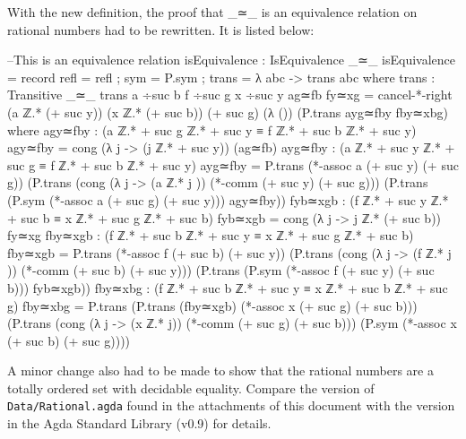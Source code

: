 \documentclass[11pt,a4paper]{article}
\begin{document}
With the new definition, the proof that \_≃\_ is an equivalence relation on rational numbers had to be rewritten. It is listed below:
\begin{code}
--This is an equivalence relation
isEquivalence : IsEquivalence _≃_
isEquivalence = record {
  refl = refl ;
  sym = P.sym ;
  trans = λ {a}{b}{c} -> trans {a}{b}{c}
  }
    where
    trans : Transitive _≃_
    trans {a ÷suc b} {f ÷suc g} {x ÷suc y} ag≃fb fy≃xg = 
      cancel-*-right (a ℤ.* (+ suc y)) (x ℤ.* (+ suc b)) (+ suc g) (λ {()}) 
        (P.trans ayg≃fby fby≃xbg)
      where
        agy≃fby : (a ℤ.* + suc g ℤ.* + suc y ≡ f ℤ.* + suc b ℤ.* + suc y)
        agy≃fby = cong (λ j -> (j ℤ.* + suc y)) (ag≃fb)
        ayg≃fby : (a ℤ.* + suc y ℤ.* + suc g ≡ f ℤ.* + suc b ℤ.* + suc y)
        ayg≃fby = P.trans (*-assoc a (+ suc y) (+ suc g)) 
          (P.trans (cong (λ j -> (a ℤ.* j )) (*-comm (+ suc y) (+ suc g))) 
            (P.trans (P.sym (*-assoc a (+ suc g) (+ suc y))) agy≃fby))
        fyb≃xgb : (f ℤ.* + suc y ℤ.* + suc b ≡ x ℤ.* + suc g ℤ.* + suc b)
        fyb≃xgb = cong (λ j -> j ℤ.* (+ suc b)) fy≃xg
        fby≃xgb : (f ℤ.* + suc b ℤ.* + suc y ≡ x ℤ.* + suc g ℤ.* + suc b)
        fby≃xgb = P.trans (*-assoc f (+ suc b) (+ suc y)) 
          (P.trans (cong (λ j -> (f ℤ.* j )) (*-comm (+ suc b) (+ suc y))) 
            (P.trans (P.sym (*-assoc f (+ suc y) (+ suc b))) fyb≃xgb))
        fby≃xbg : (f ℤ.* + suc b ℤ.* + suc y ≡ x ℤ.* + suc b ℤ.* + suc g)
        fby≃xbg = P.trans (P.trans (fby≃xgb) (*-assoc x (+ suc g) (+ suc b))) 
          (P.trans (cong (λ j -> (x ℤ.* j)) (*-comm (+ suc g) (+ suc b))) 
            (P.sym (*-assoc x (+ suc b) (+ suc g))))
\end{code}
A minor change also had to be made to show that the rational numbers are a totally ordered set with decidable equality. Compare the version of \texttt{Data/Rational.agda} found in the attachments of this document with the version in the Agda Standard Library (v0.9) for details.
\end{document}

